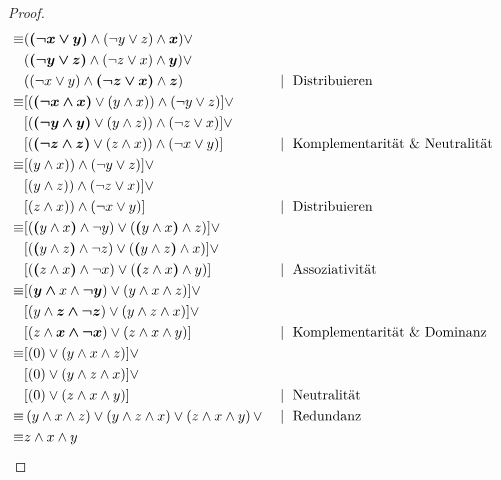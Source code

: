 \documentclass[11pt, paper=a4]{scrartcl}
\begin{document}
\begin{proof}
\begin{align}
\equiv
%
& ( \bm{\left(\neg x \vee y\right)} \wedge \left(\neg y \vee z\right) \wedge  \bm{x}) \vee \notag\\
& ( \bm{\left(\neg y \vee z\right)} \wedge \left(\neg z \vee x\right) \wedge  \bm{y}) \vee \notag\\
& (\left(\neg x \vee y\right) \wedge  \bm{\left(\neg z \vee x\right)} \wedge  \bm{z})
 && \mid\text{ Distribuieren}\\
\equiv
%
& [ (\bm{\left(\neg x \wedge x\right)} \vee \left(y \wedge x\right)) \wedge \left(\neg y \vee z\right)] \vee \notag\\
& [ (\bm{\left(\neg y \wedge y\right)} \vee \left(y \wedge z\right)) \wedge \left(\neg z \vee x\right)] \vee \notag\\
& [ (\bm{\left(\neg z \wedge z\right)} \vee \left(z \wedge x\right)) \wedge \left(\neg x \vee y\right)] && \mid\text{ Komplementarit\"at \& Neutralit\"at}\\
\equiv
%
& [\left(y \wedge x\right)) \wedge \left(\neg y \vee z\right)] \vee \notag\\
& [\left(y \wedge z\right)) \wedge \left(\neg z \vee x\right)] \vee \notag\\
& [\left(z \wedge x\right)) \wedge \left(\neg x \vee y\right)]
 && \mid\text{ Distribuieren}\\
\equiv
%
& [\left( \bm{\left(}y \wedge x \bm{\right)} \wedge \neg y) \vee ( \bm{\left(}y \wedge x \bm{\right)} \wedge z\right)] \vee \notag\\
& [\left( \bm{\left(}y \wedge z \bm{\right)} \wedge \neg z) \vee ( \bm{\left(}y \wedge z \bm{\right)} \wedge x\right)] \vee \notag\\
& [\left( \bm{\left(}z \wedge x \bm{\right)} \wedge \neg x) \vee ( \bm{\left(}z \wedge x \bm{\right)} \wedge y\right)]
 && \mid\text{ Assoziativit\"at}\\
\equiv
%
& [\left( \bm{y \wedge} x \wedge  \bm{\neg y}) \vee (y \wedge x \wedge z\right)] \vee \notag\\
& [\left(y \wedge  \bm{z \wedge \neg z}) \vee (y \wedge z \wedge x\right)] \vee \notag\\
& [\left(z \wedge  \bm{x \wedge \neg x}) \vee (z \wedge x \wedge y\right)]
 && \mid\text{ Komplementarit\"at \& Dominanz}\\
\equiv
%
& [\left(0) \vee (y \wedge x \wedge z\right)] \vee \notag\\
& [\left(0) \vee (y \wedge z \wedge x\right)] \vee \notag\\
& [\left(0) \vee (z \wedge x \wedge y\right)] && \mid\text{ Neutralit\"at}\\
\equiv
%
& \left(y \wedge x \wedge z\right) \vee
\left(y \wedge z \wedge x\right) \vee
\left(z \wedge x \wedge y\right) \vee && \mid\text{ Redundanz}\\
\equiv 
%
& z \wedge x \wedge y && \qedhere
\end{align}
\end{proof}
\end{document}
